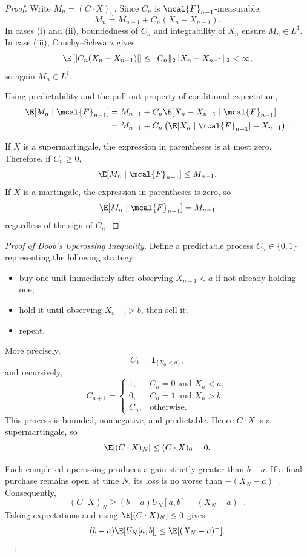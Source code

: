 \begin{proof}
Write $M_n=(C\cdot X)_n$. Since $C_n$ is
$\mcal{F}_{n-1}$-measurable,
\[
    M_n=M_{n-1}+C_n(X_n-X_{n-1}).
\]
In cases (i) and (ii), boundedness of $C_n$ and integrability of $X_n$
ensure $M_n\in L^1$. In case (iii), Cauchy--Schwarz gives
\[
    \E\left[
        \left|C_n(X_n-X_{n-1})\right|
    \right]
    \leq
    \|C_n\|_2\|X_n-X_{n-1}\|_2<\infty,
\]
so again $M_n\in L^1$.

Using predictability and the pull-out property of conditional
expectation,
\begin{align*}
    \E[M_n\mid\mcal{F}_{n-1}]
    &=
    M_{n-1}
    +
    C_n\E[X_n-X_{n-1}\mid\mcal{F}_{n-1}] \\
    &=
    M_{n-1}
    +
    C_n\left(
        \E[X_n\mid\mcal{F}_{n-1}]-X_{n-1}
    \right).
\end{align*}

If $X$ is a supermartingale, the expression in parentheses is at most
zero. Therefore, if $C_n\geq 0$,
\[
    \E[M_n\mid\mcal{F}_{n-1}]\leq M_{n-1}.
\]
If $X$ is a martingale, the expression in parentheses is zero, so
\[
    \E[M_n\mid\mcal{F}_{n-1}]=M_{n-1}
\]
regardless of the sign of $C_n$.
\end{proof}

\begin{proof}[Proof of Doob's Upcrossing Inequality]
Define a predictable process $C_n\in\{0,1\}$ representing the
following strategy:

\begin{itemize}
    \item buy one unit immediately after observing $X_{n-1}<a$ if not
    already holding one;
    \item hold it until observing $X_{n-1}>b$, then sell it;
    \item repeat.
\end{itemize}

More precisely,
\[
    C_1=\mathbf{1}_{\{X_0<a\}},
\]
and recursively,
\[
    C_{n+1}
    =
    \begin{cases}
        1, & C_n=0 \text{ and } X_n<a,\\
        0, & C_n=1 \text{ and } X_n>b,\\
        C_n, & \text{otherwise}.
    \end{cases}
\]
This process is bounded, nonnegative, and predictable. Hence
$C\cdot X$ is a supermartingale, so
\[
    \E[(C\cdot X)_N]\leq (C\cdot X)_0=0.
\]

Each completed upcrossing produces a gain strictly greater than
$b-a$. If a final purchase remains open at time $N$, its loss is no
worse than $-(X_N-a)^-$. Consequently,
\[
    (C\cdot X)_N
    \geq
    (b-a)U_N[a,b]-(X_N-a)^-.
\]
Taking expectations and using $\E[(C\cdot X)_N]\leq 0$ gives
\[
    (b-a)\E[U_N[a,b]]
    \leq
    \E[(X_N-a)^-].
\]
\end{proof}

